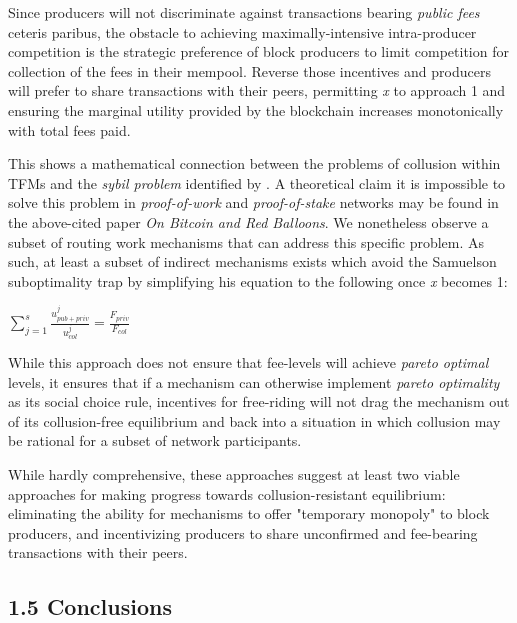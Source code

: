 \documentclass[oneside]{article}   	%
\begin{document}
Since producers will not discriminate against transactions bearing \textit{public fees} ceteris paribus, the obstacle to achieving maximally-intensive intra-producer competition is the strategic preference of block producers to limit competition for collection of the fees in their mempool. Reverse those incentives and producers will prefer to share transactions with their peers, permitting \textit{x} to approach 1 and ensuring the marginal utility provided by the blockchain increases monotonically with total fees paid.

This shows a mathematical connection between the problems of collusion within TFMs and the \textit{sybil problem} identified by \cite{babaioffredballoons}. A theoretical claim it is impossible to solve this problem in \textit{proof-of-work} and \textit{proof-of-stake} networks may be found in the above-cited paper \textit{On Bitcoin and Red Balloons}. We nonetheless observe a subset of routing work mechanisms that can address this specific problem. As such, at least a subset of indirect mechanisms exists which avoid the Samuelson suboptimality trap by simplifying his equation to the following once \textit{x} becomes 1:

\LARGE
\begin{adjustwidth}{1.5em}{1.5em}
\begin{math}
\sum_{j=1}^{s} \frac{u_{{pub}+{priv}}^j}{u_{col}^j} = \frac{F_{{priv}}}{F_{col}}
\end{math}
\end{adjustwidth}
\normalsize

While this approach does not ensure that fee-levels will achieve \textit{pareto optimal} levels, it ensures that if a mechanism can otherwise implement \textit{pareto optimality} as its social choice rule, incentives for free-riding will not drag the mechanism out of its collusion-free equilibrium and back into a situation in which collusion may be rational for a subset of network participants. 

While hardly comprehensive, these approaches suggest at least two viable approaches for making progress towards collusion-resistant equilibrium: eliminating the ability for mechanisms to offer "temporary monopoly" to block producers, and incentivizing producers to share unconfirmed and fee-bearing transactions with their peers.


\subsection*{1.5 Conclusions}
\end{document}

